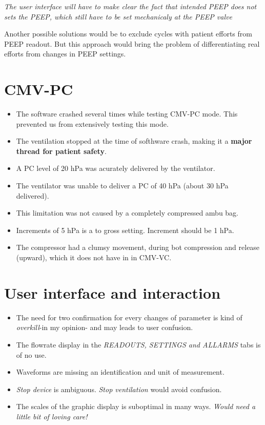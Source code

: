 \documentclass{nrepport}
\begin{document}
\emph{The user interface will have to make clear the fact
that intended PEEP does not sets the PEEP, which still have to be set
mechanicaly at the PEEP valve}

Another possible solutions would be to exclude cycles with patient
efforts from PEEP readout. But this approach would bring the problem
of differentiating real efforts from changes in PEEP settings.

\section{CMV-PC}

\begin{itemize}
		\begin{figure}
			\caption{The software crashed several times in CMV-PC mode. The
			ventilation stopped at the time of crash and the ventilator had
			to be reboot.}
		\end{figure}

	\item The software crashed several times while testing CMV-PC mode.
		This prevented us from extensively testing this mode.
	\item The ventilation stopped at the time of softhware crash, making
		it a {\bf major thread for patient safety}.
	\item A PC level of 20 hPa was acurately delivered by the
		ventilator.
	\item The ventilator was unable to deliver a PC of 40 hPa (about 30
		hPa delivered).
	\item This limitation was not caused by a completely compressed
		ambu bag.
	\item Increments of 5 hPa is a to gross setting. Increment should be
		1 hPa.
	\item The compressor had a clumsy movement, during bot compression
		and release (upward), which it does not have in in CMV-VC.
\end{itemize}

\section{User interface and interaction}

\begin{itemize}
	\item The need for two confirmation for every changes of parameter
		is kind of \emph{overkill}-in my opinion- and may leads to user
		confusion.
	\item The flowrate display in the \emph{READOUTS, SETTINGS and
		ALLARMS} tabs is of no use.
	\item Waveforms are missing an identification and unit of
			measurement.
	\item \emph{Stop device} is ambiguous. \emph{Stop ventilation} would
		avoid confusion.
	\item The scales of the graphic display is suboptimal in many ways.
		\emph{Would need a little bit of loving care!}
\end{itemize}
\end{document}
